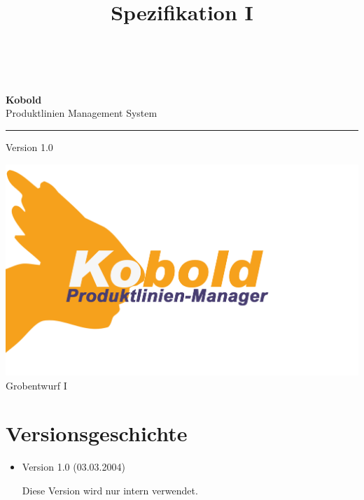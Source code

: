 \documentclass[a4paper,titlepage,12pt,ngerman]{scrbook}
\title {\huge \product\\[0.5cm]\large Spezifikation I \\[0.5cm] \version
  \\[1cm] \Large \company}
\newcommand\version{Version 1.0\xspace}
\begin{document}

\begin{titlepage}
\renewcommand{\thefootnote}{\fnsymbol{footnote}}
{\Huge
\raggedright
\textbf{\bf Kobold} \\
\huge Produktlinien Management System
\rule{\textwidth}{0.75pt}
\par
}
\begin{flushleft}
\normalsize
\version
\end{flushleft}


\vfill
\includegraphics[width=15cm]{../common/logo-color.png}
\vfill
{\parindent=0cm
\Huge Grobentwurf I
}


\setcounter{footnote}{0}
\end{titlepage}


\section*{Versionsgeschichte}

\begin{itemize}

\item Version 1.0 (03.03.2004)
    
    Diese Version wird nur intern verwendet.

\end{itemize}

\tableofcontents





\appendix

\end{document}

